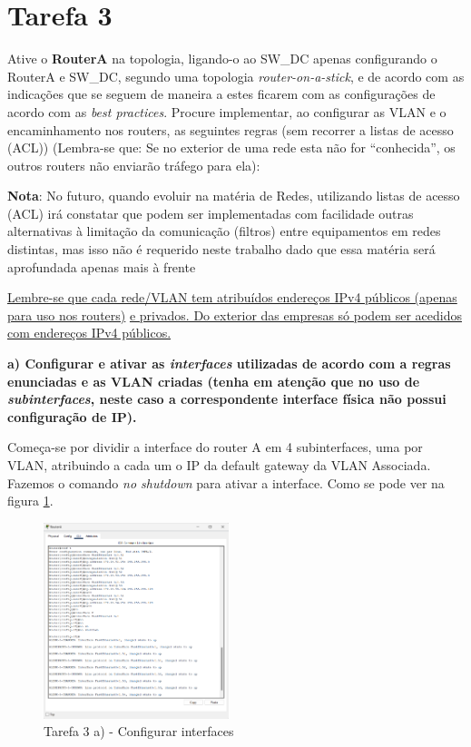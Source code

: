 \documentclass[11pt,english, openright, oneside]{book}
\begin{document}
\section{Tarefa 3}
\vspace{0.2cm}

Ative o \textbf{RouterA} na topologia, ligando-o ao SW\_DC apenas configurando o
RouterA e SW\_DC, segundo uma topologia \textit{router-on-a-stick}, e de acordo
com as indicações que se seguem de maneira a estes ficarem com as configurações
de acordo com as \textit{best practices}. Procure implementar, ao configurar as
VLAN e o encaminhamento nos routers, as seguintes regras (sem recorrer a listas
de acesso (ACL)) (Lembra-se que: Se no exterior de uma rede esta não for
“conhecida”, os outros routers não enviarão tráfego para ela):

\textbf{Nota}: No futuro, quando evoluir na matéria de Redes, utilizando listas
de acesso (ACL) irá constatar que podem ser implementadas com facilidade outras
alternativas à limitação da comunicação (filtros) entre equipamentos em redes
distintas, mas isso não é requerido neste trabalho dado que essa matéria será
aprofundada apenas mais à frente

\underline{Lembre-se que cada rede/VLAN tem atribuídos endereços IPv4 públicos (apenas para uso nos routers)}
\underline{e privados. Do exterior das empresas só podem ser acedidos com endereços IPv4 públicos.}

\vspace{0.8cm}

\textbf{a) Configurar e ativar as \textit{interfaces} utilizadas de acordo com a
regras enunciadas e as VLAN criadas (tenha em atenção que no uso de
\textit{subinterfaces}, neste caso a correspondente interface física não possui
configuração de IP).}
\vspace{0.2cm}

Começa-se por dividir a interface do router A em 4 subinterfaces, uma por VLAN,
atribuindo a cada um o IP da default gateway da VLAN Associada. Fazemos o
comando \textit{no shutdown} para ativar a interface. Como se pode ver na figura
\ref{fig:3a}.

\begin{figure}[H]
    \centering
    \includegraphics[width=0.48\textwidth]{imagens/Tarefa3/3.a.png}
    \caption{Tarefa 3 a) - Configurar interfaces}
    \label{fig:3a}
\end{figure}
\end{document}
